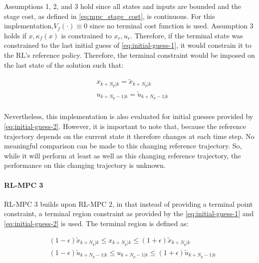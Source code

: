 Assumptions 1, 2, and 3 hold since all states and inputs are bounded and the stage cost, as defined in \autoref{eq:mpc_stage_cost}, is continuous. For this implementation,$V_f(\cdot) \equiv 0$ since no terminal cost function is used. Assumption 3 holds if $x,\kappa_f(x)$ is constrained to $x_r,u_r$. Therefore, if the terminal state was constrained to the last initial guess of \autoref{eq:initial-guess-1}, it would constrain it to the RL’s reference policy. Therefore, the terminal constraint would be imposed on the last state of the solution such that:

\begin{equation}\label{eq:terminal-constraint-ocp}
\begin{aligned}
	&x_{k+N_p|k} = \tilde{x}_{k+N_p|k}\\ 
	&u_{k+N_p-1|k} = \tilde{u}_{k+N_p-1|k}\\
\end{aligned}
\end{equation}

Nevertheless, this implementation is also evaluated for initial guesses provided by \autoref{eq:initial-guess-2}. However, it is important to note that, because the reference trajectory depends on the current state it therefore changes at each time step. No meaningful comparison can be made to this changing reference trajectory. So, while it will perform at least as well as this changing reference trajectory, the performance on this changing trajectory is unknown.

\paragraph{RL-MPC 3}
RL-MPC 3 builds upon RL-MPC 2, in that instead of providing a terminal point constraint, a terminal region constraint as provided by the \autoref{eq:initial-guess-1} and \autoref{eq:initial-guess-2} is used. The terminal region is defined as:

\begin{equation}\label{eq:terminal-region}
	\begin{aligned}
		& (1-\epsilon)\tilde{x}_{k+N_p|k} \leq x_{k+N_p|k} \leq (1+\epsilon)\tilde{x}_{k+N_p|k}\\
		&(1-\epsilon)\tilde{u}_{k+N_p-1|k} \leq u_{k+N_p-1|k} \leq (1+\epsilon) \tilde{u}_{k+N_p-1|k}\\
	\end{aligned}
\end{equation}


